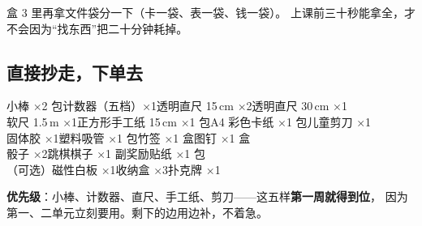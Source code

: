 \noindent 盒 3 里再拿文件袋分一下（卡一袋、表一袋、钱一袋）。
上课前三十秒能拿全，才不会因为“找东西”把二十分钟耗掉。

\subsection{直接抄走，下单去}

\begin{tipbox}
小棒 ×2 包\quad 计数器（五档）×1\quad 透明直尺 15\,cm ×2\quad 透明直尺 30\,cm ×1\\
软尺 1.5\,m ×1\quad 正方形手工纸 15\,cm ×1 包\quad A4 彩色卡纸 ×1 包\quad 儿童剪刀 ×1\\
固体胶 ×1\quad 塑料吸管 ×1 包\quad 竹签 ×1 盒\quad 图钉 ×1 盒\\
骰子 ×2\quad 跳棋棋子 ×1 副\quad 奖励贴纸 ×1 包\\
（可选）磁性白板 ×1\quad 收纳盒 ×3\quad 扑克牌 ×1
\end{tipbox}

\noindent \textbf{优先级}：小棒、计数器、直尺、手工纸、剪刀——这五样\textbf{第一周就得到位}，
因为第一、二单元立刻要用。剩下的边用边补，不着急。
